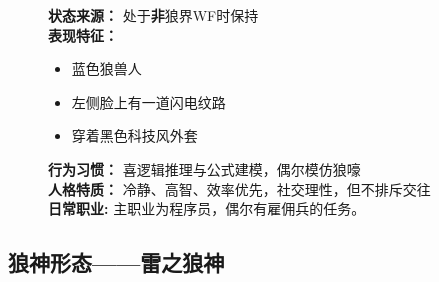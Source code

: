 \documentclass[lang=cn,newtx,10pt,scheme=chinese]{elegantbook}
\begin{document}
\begin{figure}[H]
\begin{minipage}[c]{0.48\textwidth}
        \label{fig:wfnormal}
    \end{minipage}
    \hfill
    \begin{minipage}[c]{0.48\textwidth}
        \textbf{状态来源：} 处于\textbf{非}狼界WF时保持 \\
        \textbf{表现特征：}
        \begin{itemize}
            \setlength\itemsep{0em}
            \item 蓝色狼兽人
            \item 左侧脸上有一道闪电纹路
            \item 穿着黑色科技风外套
        \end{itemize}
        \textbf{行为习惯：} 喜逻辑推理与公式建模，偶尔模仿狼嚎 \\
        \textbf{人格特质：} 冷静、高智、效率优先，社交理性，但不排斥交往\\
        \textbf{日常职业:} 主职业为程序员，偶尔有雇佣兵的任务。\\
        \vspace*{\fill}
    \end{minipage}
\end{figure}

\newpage

\subsection{狼神形态——雷之狼神}
\end{document}
